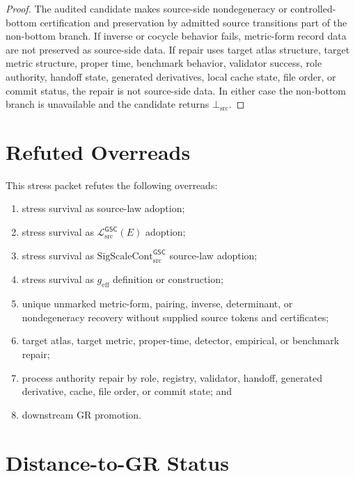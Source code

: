 \documentclass[11pt]{article}
\newcommand{\MetricData}{\mathcal{L}_{\mathrm{src}}^{\mathsf{GSC}}}
\newcommand{\geff}{g_{\mathrm{eff}}}
\newcommand{\SigScaleCont}{\mathrm{SigScaleCont}_{\mathrm{src}}^{\mathsf{GSC}}}
\newcommand{\BottomSrc}{\bot_{\mathrm{src}}}
\begin{document}
\begin{proof}
The audited candidate makes source-side nondegeneracy or controlled-bottom
certification and preservation by admitted source transitions part of the
non-bottom branch. If inverse or cocycle behavior fails, metric-form record
data are not preserved as source-side data. If repair uses target atlas
structure, target metric structure, proper time, benchmark behavior,
validator success, role authority, handoff state, generated derivatives,
local cache state, file order, or commit status, the repair is not source-side
data. In either case the non-bottom branch is unavailable and the candidate
returns \(\BottomSrc\).
\end{proof}

\section{Refuted Overreads}

This stress packet refutes the following overreads:
\begin{enumerate}[leftmargin=*]
  \item stress survival as source-law adoption;
  \item stress survival as \(\MetricData(E)\) adoption;
  \item stress survival as \(\SigScaleCont\) source-law adoption;
  \item stress survival as \(\geff\) definition or construction;
  \item unique unmarked metric-form, pairing, inverse, determinant, or
  nondegeneracy recovery without supplied source tokens and certificates;
  \item target atlas, target metric, proper-time, detector, empirical, or
  benchmark repair;
  \item process authority repair by role, registry, validator, handoff,
  generated derivative, cache, file order, or commit state; and
  \item downstream GR promotion.
\end{enumerate}

\section{Distance-to-GR Status}
\end{document}
